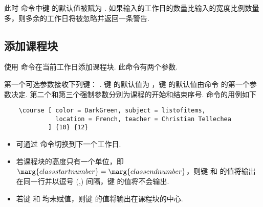 \documentclass[letterpaper]{l3doc}
\newenvironment{example}{\begin{list}{}{\leftmargin=3em}\item }{\end{list}}
\begin{document}
此时  命令中键  的默认值被赋为 . 如果输入的工作日的数量比输入的宽度比例数量多，则多余的工作日将被忽略并返回一条警告.

\subsection{添加课程块}

使用  命令在当前工作日添加课程块. 此命令有两个参数.

\begin{example}
\end{example}

第一个可选参数接收下列键：    . 键  的默认值为 ，键  的默认值由命令  的第一个参数决定. 第二个和第三个强制参数分别为课程的开始和结束序号.  命令的用例如下

\begin{Verbatim}
    \course [ color = DarkGreen, subject = listofitems, 
              location = French, teacher = Christian Tellechea
            ] {10} {12}
\end{Verbatim}

\begin{center}
    \noindent{}
\end{center}

\begin{itemize}
    \item 可通过  命令切换到下一个工作日.
    \item 若课程块的高度只有一个单位，即$\marg{class start number} = \marg{class end number}$，则键  和  的值将输出在同一行并以逗号 (,) 间隔，键  的值将不会输出.
    \item 若键  和  均未赋值，则键  的值将输出在课程块的中心.
\end{itemize}


\end{document}
